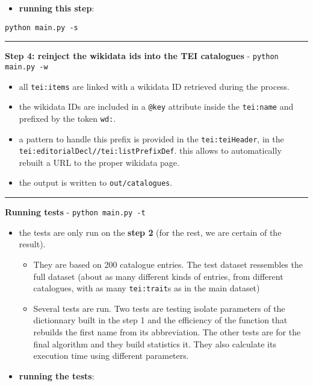 \begin{itemize}
\item \textbf{running this step}: 
\end{itemize}

\begin{lstlisting}
python main.py -s
\end{lstlisting}

\par\noindent\rule{\linewidth}{0.4pt}

\textbf{Step 4: reinject the wikidata ids into the TEI catalogues} - \texttt{python main.py -w}

\begin{itemize}
\item all \texttt{tei:items} are linked with a wikidata ID retrieved during the process. 
\item the wikidata IDs are included in a \texttt{@key} attribute inside the \texttt{tei:name} and prefixed by the token \texttt{wd:}.
\item a pattern to handle this prefix is provided in the \texttt{tei:teiHeader}, in the \texttt{tei:editorialDecl//tei:listPrefixDef}. this allows to automatically rebuilt a URL to the proper wikidata page.
\item the output is written to \texttt{out/catalogues}. 
\end{itemize}

\par\noindent\rule{\linewidth}{0.4pt}

\textbf{Running tests} - \texttt{python main.py -t}

\begin{itemize}
\item the tests are only run on the \textbf{step 2} (for the rest, we are certain of the result). 
\begin{itemize} 
 \item They are based on 200 catalogue entries. The test dataset ressembles the full dataset (about as many different kinds of entries, from different catalogues, with as many \texttt{tei:trait}s as in the main dataset)
\item Several tests are run. Two tests are testing isolate parameters of the dictionnary built in the step 1 and the efficiency of the function that rebuilds the first name from its abbreviation. The other tests are for the final algorithm and they build statistics it. They also calculate its execution time using different parameters.
\end{itemize}
\item \textbf{running the tests}: 
\end{itemize}

